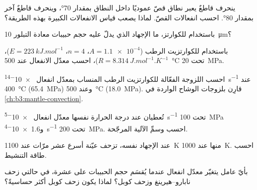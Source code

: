 \begin{exercise}[$\star$]\label{exo:b3:deformation-mechanisms:2}
ينحرف قاطعٌ يعبر نطاق قصّ عموديًا داخل النطاق بمقدار
\ang{70}، وينحرف قاطعٌ آخر بمقدار \ang{80}. احسب انفعالات القصّ. لماذا
يصعب قياس الانفعالات الكبيرة بهذه الطريقة؟
\end{exercise}

\begin{exercise}[$\star$]\label{exo:b3:deformation-mechanisms:3}
باستخدام  للكوارتز، ما الإجهاد الذي يدلّ عليه
حجم حبيبات معادة التبلور \qty{10}{\micro m}؟
\end{exercise}

\begin{exercise}[$\star$]\label{exo:b3:deformation-mechanisms:4}
باستخدام  للكوارتزيت الرطب ($A = \num{1.1e-4}$، $n = 4$، $E =
\qty{223}{kJ.mol^{-1}}$)، $R = \qty{8.314}{J.mol^{-1}.K^{-1}}$)، احسب
معدّل الانفعال عند \qty{500}{\celsius} تحت \qty{20}{MPa}.
\end{exercise}

\begin{exercise}[$\star\star$]\label{exo:b3:deformation-mechanisms:5}
احسب اللزوجة الفعّالة للكوارتزيت الرطب المنساب بمعدّل انفعال \qty{e-14}{s^{-1}}
عند \qty{400}{\celsius} (\qty{65.4}{MPa}) وعند \qty{500}{\celsius}
(\qty{18.0}{MPa}). قارِن بلزوجات الوشاح
الواردة في \cref{ch:b3:mantle-convection}.
\end{exercise}

\begin{exercise}[$\star\star$]\label{exo:b3:deformation-mechanisms:6}
تُعطيان عند درجة الحرارة نفسها معدّل انفعال \qty{e-5}{s^{-1}} تحت
\qty{100}{MPa} و\qty{1.6e-4}{s^{-1}} تحت \qty{200}{MPa}. احسب 
وسمِّ الآلية المرجّحة.
\end{exercise}

\begin{exercise}[$\star\star$]\label{exo:b3:deformation-mechanisms:7}
عند الإجهاد نفسه، تزحف عيّنة أسرع عشر مرّات عند \qty{1100}{K} منها عند
\qty{1000}{K}. احسب طاقة التنشيط.
\end{exercise}

\begin{exercise}[$\star\star$]\label{exo:b3:deformation-mechanisms:8}
بأيّ عامل يتغيّر معدّل انفعال  عندما يُقسَم حجم الحبيبات
على عشرة، في حالتي زحف نابارو--هيرينغ وزحف كوبل؟ لماذا يكون زحف كوبل
أكثر حساسيةً؟
\end{exercise}

